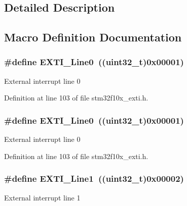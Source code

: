 \subsection{Detailed Description}


\subsection{Macro Definition Documentation}
\subsubsection[{\texorpdfstring{E\+X\+T\+I\+\_\+\+Line0}{EXTI_Line0}}]{\setlength{\rightskip}{0pt plus 5cm}\#define E\+X\+T\+I\+\_\+\+Line0~(({\bf uint32\+\_\+t})0x00001)}\hypertarget{group___e_x_t_i___lines_gac2a65680200dd5f4f7eab29cd4091a75}{}\label{group___e_x_t_i___lines_gac2a65680200dd5f4f7eab29cd4091a75}
External interrupt line 0 

Definition at line 103 of file stm32f10x\+\_\+exti.\+h.

\subsubsection[{\texorpdfstring{E\+X\+T\+I\+\_\+\+Line0}{EXTI_Line0}}]{\setlength{\rightskip}{0pt plus 5cm}\#define E\+X\+T\+I\+\_\+\+Line0~(({\bf uint32\+\_\+t})0x00001)}\hypertarget{group___e_x_t_i___lines_gac2a65680200dd5f4f7eab29cd4091a75}{}\label{group___e_x_t_i___lines_gac2a65680200dd5f4f7eab29cd4091a75}
External interrupt line 0 

Definition at line 103 of file stm32f10x\+\_\+exti.\+h.

\subsubsection[{\texorpdfstring{E\+X\+T\+I\+\_\+\+Line1}{EXTI_Line1}}]{\setlength{\rightskip}{0pt plus 5cm}\#define E\+X\+T\+I\+\_\+\+Line1~(({\bf uint32\+\_\+t})0x00002)}\hypertarget{group___e_x_t_i___lines_gae7c6ab2a0880ce3810641ee0585104cd}{}\label{group___e_x_t_i___lines_gae7c6ab2a0880ce3810641ee0585104cd}
External interrupt line 1 

